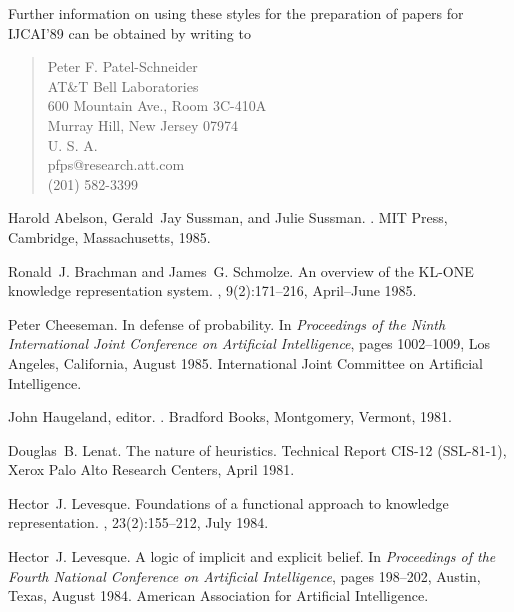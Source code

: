 Further information on using these styles for the preparation of papers for
IJCAI'89 can be obtained by writing to
\begin{quote}
Peter F. Patel-Schneider \\
AT\&T Bell Laboratories \\
600 Mountain Ave., Room 3C-410A \\
Murray Hill, New Jersey \hspace{1em} 07974 \\
U. S. A. \\
pfps@research.att.com \\
(201) 582-3399
\end{quote}

%
%
\begin{thebibliography}{}

Harold Abelson, Gerald~Jay Sussman, and Julie Sussman.
.
\newblock MIT Press, Cambridge, Massachusetts, 1985.

Ronald~J. Brachman and James~G. Schmolze.
\newblock An overview of the {KL-ONE} knowledge representation system.
, 9(2):171--216, April--June 1985.

Peter Cheeseman.
\newblock In defense of probability.
\newblock In {\em Proceedings of the Ninth International Joint Conference on
  Artificial Intelligence}, pages 1002--1009, Los Angeles, California, August
  1985. International Joint Committee on Artificial Intelligence.

John Haugeland, editor.
.
\newblock Bradford Books, Montgomery, Vermont, 1981.

Douglas~B. Lenat.
\newblock The nature of heuristics.
\newblock Technical Report CIS-12 (SSL-81-1), Xerox Palo Alto Research Centers,
  April 1981.

Hector~J. Levesque.
\newblock Foundations of a functional approach to knowledge representation.
, 23(2):155--212, July 1984.

Hector~J. Levesque.
\newblock A logic of implicit and explicit belief.
\newblock In {\em Proceedings of the Fourth National Conference on Artificial
  Intelligence}, pages 198--202, Austin, Texas, August 1984. American
  Association for Artificial Intelligence.

\end{thebibliography}






